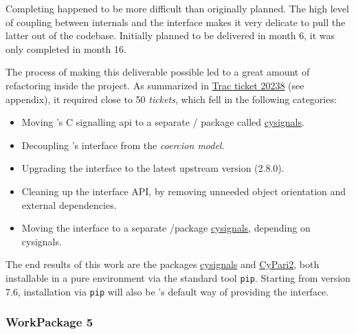 \documentclass{deliverablereport}
\begin{document}
Completing  happened to be more difficult than
originally planned. The high level of coupling between \Sage internals
and the \Pari interface makes it very delicate to pull the latter out
of the \Sage codebase. Initially planned to be delivered in month 6,
it was only completed in month 16.

The process of making this deliverable possible led to a great amount
of refactoring inside the \Sage project. As summarized in
\href{http://trac.sagemath.org/ticket/20238}{Trac ticket 20238} (see
appendix), it required close to 50 \emph{tickets}, which fell in the
following categories:

\begin{itemize}
\tightlist
\item Moving \Sage's C signalling api to a separate \Python/\Cython
  package called
  \href{https://github.com/sagemath/cysignals}{cysignals}.
\item Decoupling \Sage's \Pari interface from the \emph{coercion
    model}.
\item Upgrading the \Pari interface to the latest upstream version
  (2.8.0).
\item Cleaning up the \Pari interface API, by removing unneeded object
  orientation and external dependencies.
\item Moving the \Pari interface to a separate \Python/\Cython package
  \href{https://github.com/sagemath/cysignals}{cysignals}, depending
  on cysignals.
\end{itemize}

The end results of this work are the packages
\href{https://github.com/sagemath/cysignals}{cysignals} and
\href{https://github.com/sagemath/cypari2}{CyPari2}, both installable
in a pure \Python environment via the standard tool
\texttt{pip}. Starting from version 7.6, installation via \texttt{pip}
will also be \Sage's default way of providing the \Pari interface.
 




  \subsubsection{WorkPackage 5}
\end{document}
